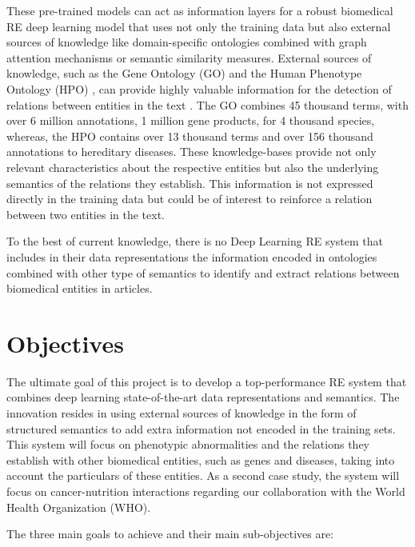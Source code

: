 These pre-trained models can act as information layers for a robust biomedical RE deep learning model that uses not only the training data but also external sources of knowledge like domain-specific ontologies combined with graph attention mechanisms or semantic similarity measures. External sources of knowledge, such as the Gene Ontology (GO) \citep{ashburner2000gene} and the Human Phenotype Ontology (HPO) \citep{robinson2010human}, can provide highly valuable information for the detection of relations between entities in the text \citep{lamurias2019bo}. The GO combines 45 thousand terms, with over 6 million annotations, 1 million gene products, for 4 thousand species, whereas, the HPO contains over 13 thousand terms and over 156 thousand annotations to hereditary diseases. These knowledge-bases provide not only relevant characteristics about the respective entities but also the underlying semantics of the relations they establish. This information is not expressed directly in the training data but could be of interest to reinforce a relation between two entities in the text.

To the best of current knowledge, there is no Deep Learning RE system that includes in their data representations the information encoded in ontologies combined with other type of semantics to identify and extract relations between biomedical entities in articles.


\hypertarget{1.2}{\section{Objectives}}

The ultimate goal of this project is to develop a top-performance RE system that combines deep learning state-of-the-art data representations and semantics. The innovation resides in using external sources of knowledge in the form of structured semantics to add extra information not encoded in the training sets. This system will focus on phenotypic abnormalities and the relations they establish with other biomedical entities, such as genes and diseases, taking into account the particulars of these entities. As a second case study, the system will focus on cancer-nutrition interactions regarding our collaboration with the World Health Organization (WHO).

The three main goals to achieve and their main sub-objectives are:

